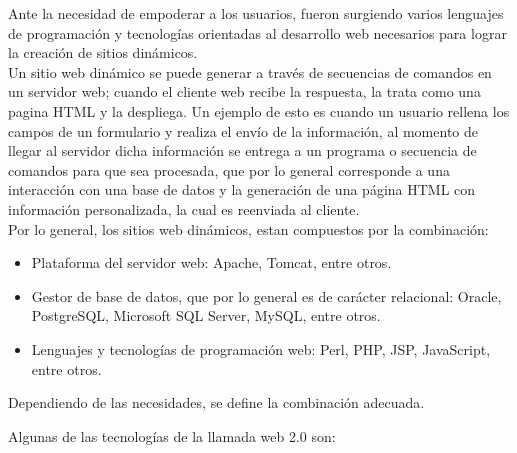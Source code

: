 Ante la necesidad de empoderar a los usuarios, fueron surgiendo varios lenguajes de programación y 
tecnologías orientadas al desarrollo web necesarios para lograr la creación de sitios dinámicos.\\

Un sitio web dinámico se puede generar a través de secuencias de comandos en un servidor web; cuando 
el cliente web recibe la respuesta, la trata como una pagina HTML y la despliega. Un ejemplo de esto 
es cuando un usuario rellena los campos de un formulario y realiza el envío de la información, al 
momento de llegar al servidor dicha información se entrega a un programa o secuencia de comandos
para que sea procesada, que por lo general corresponde a una interacción con una base de datos y 
la generación de una página HTML con información personalizada, la cual es reenviada al cliente.\\

Por lo general, los sitios web dinámicos, estan compuestos por la combinación:
\begin{itemize}
 \item Plataforma del servidor web: Apache, Tomcat, entre otros.
 \item Gestor de base de datos, que por lo general es de carácter relacional: Oracle, PostgreSQL,
	Microsoft SQL Server, MySQL, entre otros.
 \item Lenguajes y tecnologías de programación web: Perl, PHP, JSP, JavaScript, entre otros.
\end{itemize}

Dependiendo de las necesidades, se define la combinación adecuada. 


Algunas de las tecnologías de la llamada web 2.0 son:

